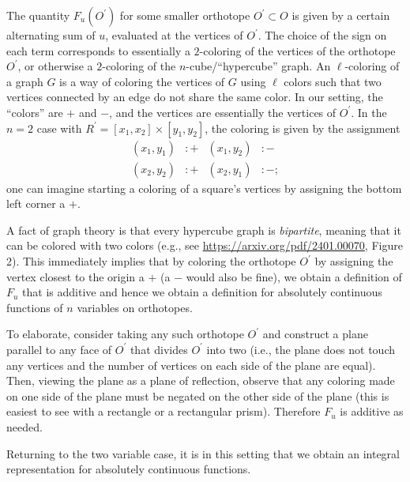 \documentclass[11pt,leqno]{article}
\theoremstyle{plain}
\theoremstyle{definition}
\numberwithin{equation}{section}
\numberwithin{lem}{section}
\begin{document}
The quantity $F_u(O^\prime)$ for some smaller orthotope $O^\prime\subset O$ is given by a certain alternating sum of $u$, evaluated at the vertices of $O^\prime$. The choice of the sign on each term corresponds to essentially a $2$-coloring of the vertices of the orthotope $O^\prime$, or otherwise a $2$-coloring of the $n$-cube/``hypercube'' graph. An $\ell$-coloring of a graph $G$ is a way of coloring the vertices of $G$ using $\ell$ colors such that two vertices connected by an edge do not share the same color. In our setting, the ``colors'' are $+$ and $-$, and the vertices are essentially the vertices of $O^\prime$. In the $n=2$ case with $R^\prime = [x_1,x_2]\times[y_1,y_2]$, the coloring is given by the assignment
\begin{align}
    (x_1,y_1) &: + & (x_1,y_2) &: - \\
    (x_2,y_2) &: + & (x_2,y_1) &: -;\nonumber
\end{align}
one can imagine starting a coloring of a square's vertices by assigning the bottom left corner a $+$.

A fact of graph theory is that every hypercube graph is \textit{bipartite}, meaning that it can be colored with two colors (e.g., see \href{https://arxiv.org/pdf/2401.00070}{https://arxiv.org/pdf/2401.00070}, Figure 2). This immediately implies that by coloring the orthotope $O^\prime$ by assigning the vertex closest to the origin a $+$ (a $-$ would also be fine), we obtain a definition of $F_u$ that is additive and hence we obtain a definition for absolutely continuous functions of $n$ variables on orthotopes.

To elaborate, consider taking any such orthotope $O^\prime$ and construct a plane parallel to any face of $O^\prime$ that divides $O^\prime$ into two (i.e., the plane does not touch any vertices and the number of vertices on each side of the plane are equal). Then, viewing the plane as a plane of reflection, observe that any coloring made on one side of the plane must be negated on the other side of the plane (this is easiest to see with a rectangle or a rectangular prism). Therefore $F_u$ is additive as needed.

Returning to the two variable case, it is in this setting that we obtain an integral representation for absolutely continuous functions.
\end{document}
